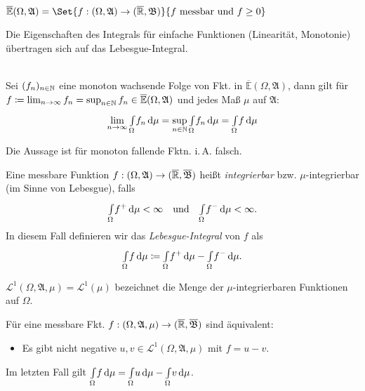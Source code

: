 \documentclass{cheat-sheet}
\newcommand{\Alg}{\mathfrak{A}} %
\newcommand{\Bor}{\mathfrak{B}} %
\newcommand{\E}{\mathbb{E}} %
\newcommand{\Leb}{\mathcal{L}} %
\theoremstyle{definition}
\newcommand{\IntOmu}[1]{\Int{\Omega}{}{#1}{\mu}} %
\begin{document}

\begin{satz}
  $\overline{\E}(\Omega, \Alg) = \Set{ f : (\Omega, \Alg) \to (\ER, \Bor) }{ f \text{ messbar und } f \geq 0 }$
\end{satz}

\begin{satz}
  Die Eigenschaften des Integrals für einfache Funktionen (Linearität, Monotonie) übertragen sich auf das Lebesgue-Integral.
\end{satz}

\begin{satz}\mbox{}\\
  Sei $(f_n)_{n \in \mathbb{N}}$ eine monoton wachsende Folge von Fkt. in $\overline{\E}(\Omega, \Alg)$, dann gilt für $f \coloneqq \lim_{n \to \infty} f_n = \sup_{n \in \N} f_n \in \overline{\E}(\Omega, \Alg)$ und jedes Maß $\mu$ auf $\Alg$:
  \[ \lim_{n \to \infty} \IntOmu{f_n} = \sup_{n \in \N} \IntOmu{f_n} = \IntOmu{f} \]
\end{satz}

\begin{bem}
  Die Aussage ist für monoton fallende Fktn. i.\,A. falsch.
\end{bem}


\begin{defn}
  Eine messbare Funktion $f : (\Omega, \Alg) \to (\ER, \overline{\Bor})$ heißt \emph{integrierbar} bzw. $\mu$-integrierbar (im Sinne von Lebesgue), falls
  \[ \IntOmu{f^+} < \infty \quad \text{und} \quad \IntOmu{f^-} < \infty. \]
  In diesem Fall definieren wir das \emph{Lebesgue-Integral} von $f$ als
  \[ \IntOmu{f} \coloneqq \IntOmu{f^+} - \IntOmu{f^-}. \]
\end{defn}

\begin{nota}
  $\Leb^1(\Omega, \Alg, \mu) = \Leb^1(\mu)$ bezeichnet die Menge der $\mu$-integrierbaren Funktionen auf $\Omega$.
\end{nota}

\begin{satz}
  Für eine messbare Fkt. $f : (\Omega, \Alg, \mu) \to (\ER, \overline{\Bor})$ sind äquivalent:
  \begin{itemize}
    \item Es gibt nicht negative $u, v \in \Leb^1(\Omega, \Alg, \mu)$ mit $f = u - v$.
  \end{itemize}
  Im letzten Fall gilt $\IntOmu{f} = \IntOmu{u} - \IntOmu{v}$.
\end{satz}
\end{document}

